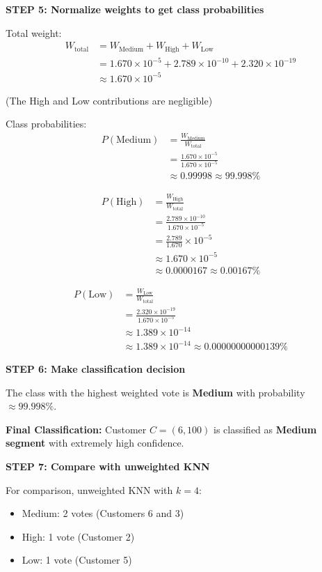 \documentclass[12pt]{article}
\begin{document}
\begin{solution}
\textbf{STEP 5: Normalize weights to get class probabilities}

Total weight:
\begin{align*}
W_{\text{total}} &= W_{\text{Medium}} + W_{\text{High}} + W_{\text{Low}} \\
&= 1.670 \times 10^{-5} + 2.789 \times 10^{-10} + 2.320 \times 10^{-19} \\
&\approx 1.670 \times 10^{-5}
\end{align*}

(The High and Low contributions are negligible)

Class probabilities:
\begin{align*}
P(\text{Medium}) &= \frac{W_{\text{Medium}}}{W_{\text{total}}} \\
&= \frac{1.670 \times 10^{-5}}{1.670 \times 10^{-5}} \\
&\approx \boxed{0.99998} \approx 99.998\%
\end{align*}

\begin{align*}
P(\text{High}) &= \frac{W_{\text{High}}}{W_{\text{total}}} \\
&= \frac{2.789 \times 10^{-10}}{1.670 \times 10^{-5}} \\
&= \frac{2.789}{1.670} \times 10^{-5} \\
&\approx 1.670 \times 10^{-5} \\
&\approx \boxed{0.0000167} \approx 0.00167\%
\end{align*}

\begin{align*}
P(\text{Low}) &= \frac{W_{\text{Low}}}{W_{\text{total}}} \\
&= \frac{2.320 \times 10^{-19}}{1.670 \times 10^{-5}} \\
&\approx 1.389 \times 10^{-14} \\
&\approx \boxed{1.389 \times 10^{-14}} \approx 0.00000000000139\%
\end{align*}

\textbf{STEP 6: Make classification decision}

The class with the highest weighted vote is \textbf{Medium} with probability $\approx 99.998\%$.

\textbf{Final Classification:} Customer \(C = (6, 100)\) is classified as \textbf{Medium segment} with extremely high confidence.

\textbf{STEP 7: Compare with unweighted KNN}

For comparison, unweighted KNN with \(k=4\):
\begin{itemize}
    \item Medium: 2 votes (Customers 6 and 3)
    \item High: 1 vote (Customer 2)
    \item Low: 1 vote (Customer 5)
\end{itemize}


\end{solution}
\end{document}
